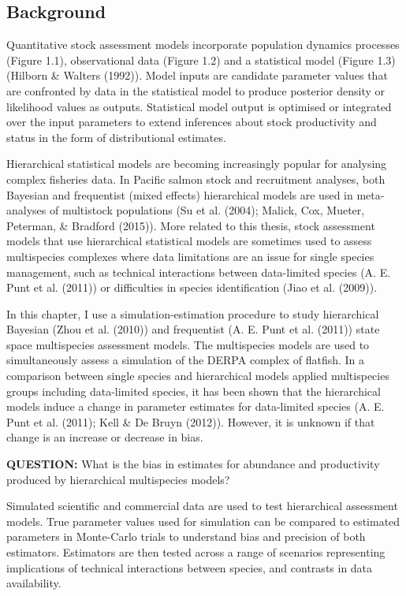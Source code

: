 \documentclass[12pt,]{scrartcl}
\begin{document}
\subsection{Background}\label{background-1}

Quantitative stock assessment models incorporate population dynamics
processes (Figure 1.1), observational data (Figure 1.2) and a
statistical model (Figure 1.3) (Hilborn \& Walters (1992)). Model inputs
are candidate parameter values that are confronted by data in the
statistical model to produce posterior density or likelihood values as
outputs. Statistical model output is optimised or integrated over the
input parameters to extend inferences about stock productivity and
status in the form of distributional estimates.

Hierarchical statistical models are becoming increasingly popular for
analysing complex fisheries data. In Pacific salmon stock and
recruitment analyses, both Bayesian and frequentist (mixed effects)
hierarchical models are used in meta-analyses of multistock populations
(Su et al. (2004); Malick, Cox, Mueter, Peterman, \& Bradford (2015)).
More related to this thesis, stock assessment models that use
hierarchical statistical models are sometimes used to assess
multispecies complexes where data limitations are an issue for single
species management, such as technical interactions between data-limited
species (A. E. Punt et al. (2011)) or difficulties in species
identification (Jiao et al. (2009)).

In this chapter, I use a simulation-estimation procedure to study
hierarchical Bayesian (Zhou et al. (2010)) and frequentist (A. E. Punt
et al. (2011)) state space multispecies assessment models. The
multispecies models are used to simultaneously assess a simulation of
the DERPA complex of flatfish. In a comparison between single species
and hierarchical models applied multispecies groups including
data-limited species, it has been shown that the hierarchical models
induce a change in parameter estimates for data-limited species (A. E.
Punt et al. (2011); Kell \& De Bruyn (2012)). However, it is unknown if
that change is an increase or decrease in bias.

\textbf{QUESTION:} What is the bias in estimates for abundance and
productivity produced by hierarchical multispecies models?

Simulated scientific and commercial data are used to test hierarchical
assessment models. True parameter values used for simulation can be
compared to estimated parameters in Monte-Carlo trials to understand
bias and precision of both estimators. Estimators are then tested across
a range of scenarios representing implications of technical interactions
between species, and contrasts in data availability.
\end{document}
